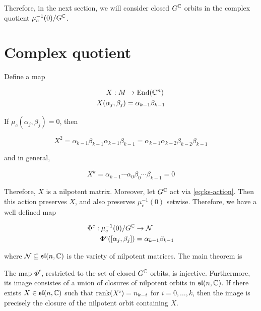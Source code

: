 \documentclass{report}
\renewcommand{\sl}{\mathfrak{sl}}
\begin{document}
Therefore, in the next section, we will consider closed \(G^{\mathbb{C}}\) orbits in the complex quotient \(\mu_c^{-1}(0)/G^{\mathbb{C}}\).

\section{Complex quotient}

Define a map

\begin{align*}
    X : M &\to \operatorname{End}(\mathbb{C}^n) \\
    X(\alpha_j, \beta_j) &= \alpha_{k-1}\beta_{k-1}
\end{align*}

If \(\mu_c(\alpha_j, \beta_j) = 0\), then

\[X^2 = \alpha_{k-1}\beta_{k-1}\alpha_{k-1}\beta_{k-1} = \alpha_{k-1}\alpha_{k-2}\beta_{k-2}\beta_{k-1}\]

and in general,

\[X^k = \alpha_{k-1}\cdots \alpha_0\beta_0\cdots \beta_{k-1} = 0\]

Therefore, \(X\) is a nilpotent matrix. Moreover, let \(G^{\mathbb{C}}\) act via \cref{eq:ks-action}. Then this action preserves \(X\), and also preserves \(\mu_c^{-1}(0)\) setwise. Therefore, we have a well defined map

\begin{align*}
    \Phi^c : \mu_c^{-1}(0)/G^{\mathbb{C}} &\to \mathcal{N} \\
    \Phi^c([\alpha_j, \beta_j]) &= \alpha_{k-1}\beta_{k-1}
\end{align*}

where \(\mcN \subseteq \sl(n, \C)\) is the variety of nilpotent matrices. The main theorem is

\begin{theorem}
    The map \(\Phi^c\), restricted to the set of closed \(G^{\mathbb{C}}\) orbits, is injective. Furthermore, its image consistes of a union of closures of nilpotent orbits in \(\sl(n, \C)\). If there exists \(X \in \sl(n, \C)\) such that \(\rank(X^i) = n_{k-i}\) for \(i = 0, \dots, k\), then the image is precisely the closure of the nilpotent orbit containing \(X\).
\end{theorem}
\end{document}
